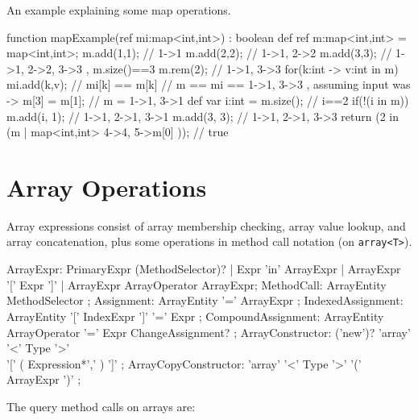 \begin{example}
An example explaining some map operations.
\begin{grgen}
function mapExample(ref mi:map<int,int>) : boolean
{
	def ref m:map<int,int> = map<int,int>{};
	m.add(1,1); // { 1->1 }
	m.add(2,2); // { 1->1, 2->2 }
	m.add(3,3); // { 1->1, 2->2, 3->3 }, m.size()==3
	m.rem(2); // { 1->1, 3->3 }
	for(k:int -> v:int in m) {
		mi.add(k,v); // mi[k] == m[k]
	} // m == mi == { 1->1, 3->3 }, assuming input was {->}
	m[3] = m[1]; // m = { 1->1, 3->1 }
	def var i:int = m.size(); // i==2
	if(!(i in m)) { 
		m.add(i, 1);
	} // { 1->1, 2->1, 3->1 }
	m.add(3, 3); // { 1->1, 2->1, 3->3 }
	return (2 in (m | map<int,int>{ 4->4, 5->m[0] })); // true
}
\end{grgen}
\end{example}


\section{Array Operations} \label{sec:arrayexpr}

Array expressions consist of array membership checking, array value lookup, and array concatenation, plus some operations in method call notation (on \texttt{array<T>}).

\begin{rail}
  ArrayExpr: PrimaryExpr (MethodSelector)? | Expr 'in' ArrayExpr | ArrayExpr '[' Expr ']' | ArrayExpr ArrayOperator ArrayExpr;
  MethodCall: ArrayEntity MethodSelector ;
  Assignment: ArrayEntity '=' ArrayExpr ;
  IndexedAssignment: ArrayEntity '[' IndexExpr ']' '=' Expr ;
  CompoundAssignment: ArrayEntity ArrayOperator '=' Expr ChangeAssignment? ;
  ArrayConstructor: ('new')? 'array' '<' Type '>' \\ '[' ( Expression*',' ) ']' ;
  ArrayCopyConstructor: 'array' '<' Type '>' '(' ArrayExpr ')' ;
\end{rail}

\noindent The query method calls on arrays are:

